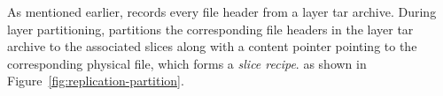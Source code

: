 %


%


As mentioned earlier, 
\sysname records every file header from a layer tar archive.
During layer partitioning,
\sysname partitions the corresponding
 file headers in the layer tar archive to
the associated slices 
along with a content pointer pointing to the corresponding physical file, 
which forms a \emph{slice recipe}.
as shown in Figure~\ref{fig:replication-partition}. 

